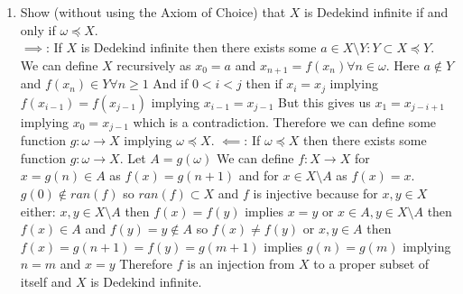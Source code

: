 \documentclass[11pt]{amsart}
\begin{document}
\begin{enumerate}
\begin{enumerate}
\vfill
\item Show (without using the Axiom of Choice) that $X$ is Dedekind infinite if and only if $\omega \preccurlyeq X$.
\\
$\implies$: If $X$ is Dedekind infinite then there exists some $a \in X\setminus Y : Y \subset X \preceq Y$.
We can define $X$ recursively as $x_0 = a$ and $x_{n+1} = f(x_n) \forall n \in \omega$.
Here $a \notin Y$ and $f(x_n) \in Y \forall n \geq 1$
And if $0<i<j$ then if $x_i = x_j$ implying $f(x_{i-1}) = f(x_{j-1})$ implying $x_{i-1} = x_{j-1}$
But this gives us $x_1 = x_{j-i+1}$ implying $x_0 = x_{j-1}$ which is a contradiction.
Therefore we can define some function $g: \omega \rightarrow X$ implying $\omega \preceq X$.
$\impliedby$: If $\omega \preceq X$ then there exists some function $g: \omega \rightarrow X$.
Let $A = g(\omega)$
We can define $f: X \rightarrow X$ for $x = g(n) \in A$ as $f(x) = g(n+1)$ and for $x \in X \setminus A$ as $f(x) = x$.
$g(0) \notin ran(f)$ so $ran(f) \subset X$ and $f$ is injective because for $x,y \in X$ either:
$x,y \in X\setminus A$ then $f(x) = f(y)$ implies $x = y$
or $x \in A, y \in X \setminus A$ then $f(x)\in A$ and $f(y)=y\notin A$ so $f(x) \neq f(y)$
or $x,y \in A$ then $f(x) = g(n+1) = f(y) = g(m+1)$ implies $g(n) = g(m)$ implying $n = m$ and $x = y$
Therefore $f$ is an injection from $X$ to a proper subset of itself and $X$ is Dedekind infinite.
\vfill
\end{enumerate}


\newpage


\end{enumerate}
\end{document}
